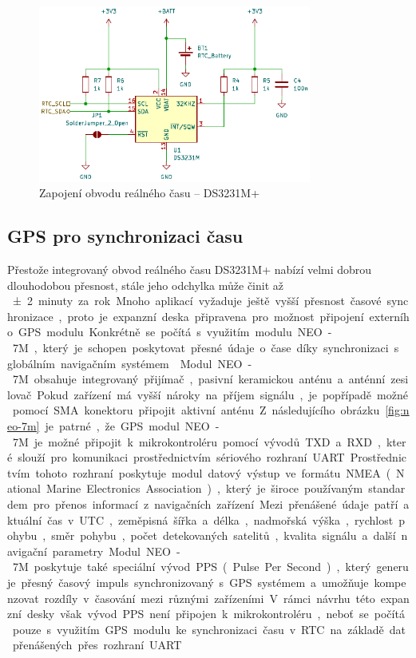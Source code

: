 \begin{figure}[h]
    \centering
    \includegraphics[width=0.80\textwidth]{obrazky-figures/ds3231m+.pdf}
    
    \caption{Zapojení obvodu reálného času -- DS3231M+}
    \label{fig:ds3231m+}
\end{figure}

\subsection{GPS pro synchronizaci času}
Přestože integrovaný obvod reálného času DS3231M+ nabízí velmi dobrou dlouhodobou přesnost, stále jeho odchylka může činit až \SI{\pm2} minuty za rok. Mnoho aplikací vyžaduje ještě vyšší přesnost časové synchronizace, proto je expanzní deska připravena pro možnost připojení externího GPS modulu. Konkrétně se~počítá s využitím modulu NEO-7M, který je schopen poskytovat přesné údaje o~čase díky synchronizaci s globálním navigačním systémem.~\cite{NEO7M_manual}

Modul NEO-7M obsahuje integrovaný přijímač, pasivní keramickou anténu a~anténní zesilovač. Pokud zařízení má vyšší nároky na příjem signálu, je popřípadě možné pomocí SMA konektoru připojit aktivní anténu. Z následujícího obrázku~\ref{fig:neo-7m} je patrné, že GPS modul NEO-7M je možné připojit k~mikrokontroléru pomocí vývodů TXD a~RXD, které slouží pro komunikaci prostřednictvím sériového rozhraní UART. Prostřednictvím tohoto rozhraní poskytuje modul datový výstup ve~formátu NMEA (National Marine Electronics Association), který je široce používaným standardem pro přenos informací z~navigačních zařízení. Mezi přenášené údaje patří aktuální čas v~UTC, zeměpisná šířka a~délka, nadmořská výška, rychlost pohybu, směr pohybu, počet detekovaných satelitů, kvalita signálu a~další navigační parametry. Modul NEO-7M poskytuje také speciální vývod PPS (Pulse Per Second), který generuje přesný časový impuls synchronizovaný s GPS systémem a~umožňuje kompenzovat rozdíly v časování mezi různými zařízeními. V~rámci návrhu této expanzní desky však vývod PPS není připojen k~mikrokontroléru, neboť se~počítá pouze s~využitím GPS modulu ke~synchronizaci času v~RTC na~základě dat přenášených přes rozhraní UART.~\cite{NEO7M_manual}

